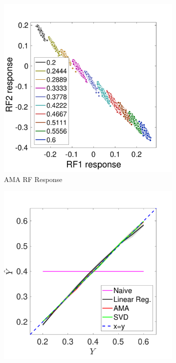 \documentclass{jov}
\begin{document}
\begin{figure}
\begin{subfigure}[b]{0.20 \textwidth}
        \includegraphics[width=\textwidth]{../Figures/Figure4/Figure4_c.pdf}
        \caption{AMA RF Response}
        \label{fig:case9FiltersResponse}
    \end{subfigure}
        \begin{subfigure}[b]{0.20 \textwidth}
        \includegraphics[width=\textwidth]{../Figures/Figure4/Figure4_d.pdf}

\end{subfigure}
\end{figure}
\end{document}
